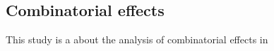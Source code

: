 \subsection{Combinatorial effects} \label{subsec_ripple_effect}

This study is a about the analysis of combinatorial effects in 